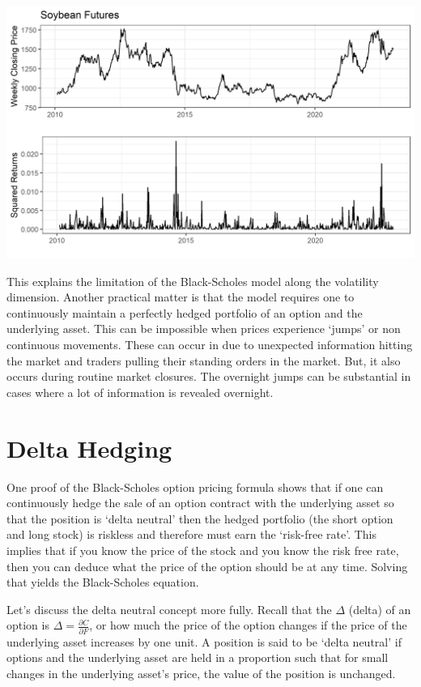 \documentclass[
  letterpaper,
  DIV=11,
  numbers=noendperiod]{scrreprt}
\begin{document}
\includegraphics{assets/Options2-volcluster.png}

This explains the limitation of the Black-Scholes model along the
volatility dimension. Another practical matter is that the model
requires one to continuously maintain a perfectly hedged portfolio of an
option and the underlying asset. This can be impossible when prices
experience `jumps' or non continuous movements. These can occur in due
to unexpected information hitting the market and traders pulling their
standing orders in the market. But, it also occurs during routine market
closures. The overnight jumps can be substantial in cases where a lot of
information is revealed overnight.

\hypertarget{delta-hedging}{%
\section{Delta Hedging}\label{delta-hedging}}

One proof of the Black-Scholes option pricing formula shows that if one
can continuously hedge the sale of an option contract with the
underlying asset so that the position is `delta neutral' then the hedged
portfolio (the short option and long stock) is riskless and therefore
must earn the `risk-free rate'. This implies that if you know the price
of the stock and you know the risk free rate, then you can deduce what
the price of the option should be at any time. Solving that yields the
Black-Scholes equation.

Let's discuss the delta neutral concept more fully. Recall that the
\(\Delta\) (delta) of an option is
\(\Delta = \frac{\partial C}{\partial F}\), or how much the price of the
option changes if the price of the underlying asset increases by one
unit. A position is said to be `delta neutral' if options and the
underlying asset are held in a proportion such that for small changes in
the underlying asset's price, the value of the position is unchanged.
\end{document}
